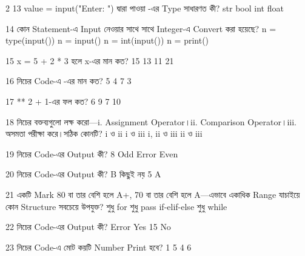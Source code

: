 \begin{multicols}{2}
\mcqwide
{13}
{\textenglish{\ttfamily value = input("Enter: ")} দ্বারা পাওয়া -এর Type সাধারণত কী?}
{str}
{bool}
{int}
{float}

\mcq
{14}
{কোন Statement-এ Input নেওয়ার সাথে সাথে Integer-এ Convert করা হয়েছে?}
{\textenglish{\ttfamily n = type(input())}}
{\textenglish{\ttfamily n = input()}}
{\textenglish{\ttfamily n = int(input())}}
{\textenglish{\ttfamily n = print()}}

\mcqwide
{15}
{\textenglish{\ttfamily x = 5 + 2 * 3} হলে x-এর মান কত?}
{15}
{13}
{11}
{21}

\mcqwide
{16}
{নিচের Code-এ -এর মান কত?}
{5}
{4}
{7}
{3}

\mcqwide
{17}
{\textenglish{ ** 2 + 1}-এর ফল কত?}
{6}
{9}
{7}
{10}

\mcqwide
{18}
{নিচের বক্তব্যগুলো লক্ষ করো—\newline i. \py{=} Assignment Operator।\newline ii. \py{==} Comparison Operator।\newline iii. \py{!=} অসমতা পরীক্ষা করে।\newline সঠিক কোনটি?}
{i ও ii}
{i ও iii}
{i, ii ও iii}
{ii ও iii}

\mcqwide
{19}
{নিচের Code-এর Output কী?}
{8}
{Odd}
{Error}
{Even}

\mcqwide
{20}
{নিচের Code-এর Output কী?}
{B}
{কিছুই নয়}
{5}
{A}

\mcq
{21}
{একটি Mark 80 বা তার বেশি হলে A+, 70 বা তার বেশি হলে A—এভাবে একাধিক Range যাচাইয়ে কোন Structure সবচেয়ে উপযুক্ত?}
{শুধু for}
{শুধু pass}
{if-elif-else}
{শুধু while}

\mcqwide
{22}
{নিচের Code-এর Output কী?}
{Error}
{Yes}
{15}
{No}

\mcqwide
{23}
{নিচের Code-এ মোট কয়টি Number Print হবে?}
{1}
{5}
{4}
{6}


\end{multicols}
